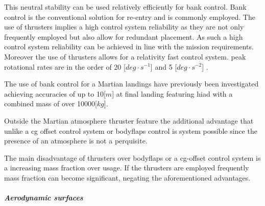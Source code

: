 This neutral stability can be used relatively efficiently for bank control. Bank control is the conventional solution for re-entry and is commonly employed. The use of thrusters implies a high control system reliability \cite{Wertz2011} as they are not only frequently employed but also allow for redundant placement. As such a high control system reliability can be achieved in line with the mission requirements. Moreover the use of thrusters allows for a relativity fast control system. peak rotational rates are in the order of 20 [$deg\cdot s^{-1}$] and 5 [$deg \cdot s^{-2}$] \cite{Davis2010}.

The use of bank control for a Martian landings have previously been investigated \cite{Davis2010} achieving accuracies of up to 10[$m$] at final landing featuring \gls{hiad} with a combined mass of over 10000[$kg$].

Outside the Martian atmosphere thruster feature the additional advantage that unlike a \gls{cg} offset control system or bodyflaps control is system possible since the presence of an atmosphere is not a perquisite.

The main disadvantage of thrusters over bodyflaps or a \gls{cg}-offset control system is a increasing mass fraction over usage. If the thrusters are employed frequently mass fraction can become significant, negating the aforementioned advantages.


\subparagraph{Aerodynamic surfaces}

